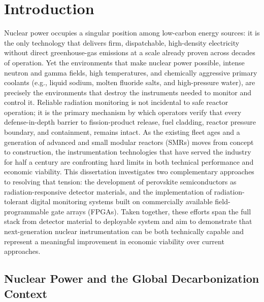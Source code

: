 


\chapter{Introduction}

Nuclear power occupies a singular position among low-carbon energy sources:
it is the only technology that delivers firm, dispatchable, high-density
electricity without direct greenhouse-gas emissions at a scale already
proven across decades of operation. Yet the environments that make nuclear
power possible, intense neutron and gamma fields, high temperatures, and
chemically aggressive primary coolants (e.g., liquid sodium, molten
fluoride salts, and high-pressure water), are precisely the environments
that destroy
the instruments needed to monitor and control it. Reliable radiation
monitoring is not incidental to safe reactor operation; it is the primary
mechanism by which operators verify that every defense-in-depth barrier
to fission-product release, fuel cladding, reactor pressure boundary,
and containment, remains intact. As the existing fleet ages and a generation of
advanced and small modular reactors (SMRs) moves from concept to
construction,
the instrumentation technologies that have served the industry for half a
century are confronting hard limits in both technical performance and
economic viability. This dissertation investigates two complementary
approaches to resolving that tension: the development of perovskite
semiconductors as radiation-responsive detector materials, and the
implementation of radiation-tolerant digital monitoring systems built on
commercially available field-programmable gate arrays (FPGAs). Taken
together, these efforts span the full stack from detector material to
deployable system and aim to demonstrate that next-generation nuclear
instrumentation can be both technically capable and represent a meaningful
improvement in economic viability over current approaches.

\section{Nuclear Power and the Global Decarbonization Context}

